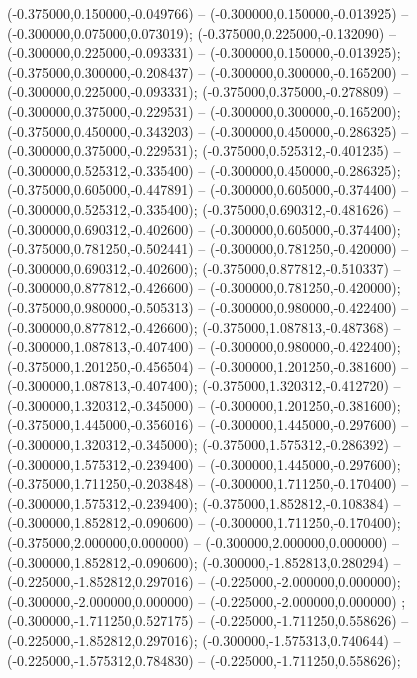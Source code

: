  (-0.375000,0.150000,-0.049766) -- (-0.300000,0.150000,-0.013925) -- (-0.300000,0.075000,0.073019);
 (-0.375000,0.225000,-0.132090) -- (-0.300000,0.225000,-0.093331) -- (-0.300000,0.150000,-0.013925);
 (-0.375000,0.300000,-0.208437) -- (-0.300000,0.300000,-0.165200) -- (-0.300000,0.225000,-0.093331);
 (-0.375000,0.375000,-0.278809) -- (-0.300000,0.375000,-0.229531) -- (-0.300000,0.300000,-0.165200);
 (-0.375000,0.450000,-0.343203) -- (-0.300000,0.450000,-0.286325) -- (-0.300000,0.375000,-0.229531);
 (-0.375000,0.525312,-0.401235) -- (-0.300000,0.525312,-0.335400) -- (-0.300000,0.450000,-0.286325);
 (-0.375000,0.605000,-0.447891) -- (-0.300000,0.605000,-0.374400) -- (-0.300000,0.525312,-0.335400);
 (-0.375000,0.690312,-0.481626) -- (-0.300000,0.690312,-0.402600) -- (-0.300000,0.605000,-0.374400);
 (-0.375000,0.781250,-0.502441) -- (-0.300000,0.781250,-0.420000) -- (-0.300000,0.690312,-0.402600);
 (-0.375000,0.877812,-0.510337) -- (-0.300000,0.877812,-0.426600) -- (-0.300000,0.781250,-0.420000);
 (-0.375000,0.980000,-0.505313) -- (-0.300000,0.980000,-0.422400) -- (-0.300000,0.877812,-0.426600);
 (-0.375000,1.087813,-0.487368) -- (-0.300000,1.087813,-0.407400) -- (-0.300000,0.980000,-0.422400);
 (-0.375000,1.201250,-0.456504) -- (-0.300000,1.201250,-0.381600) -- (-0.300000,1.087813,-0.407400);
 (-0.375000,1.320312,-0.412720) -- (-0.300000,1.320312,-0.345000) -- (-0.300000,1.201250,-0.381600);
 (-0.375000,1.445000,-0.356016) -- (-0.300000,1.445000,-0.297600) -- (-0.300000,1.320312,-0.345000);
 (-0.375000,1.575312,-0.286392) -- (-0.300000,1.575312,-0.239400) -- (-0.300000,1.445000,-0.297600);
 (-0.375000,1.711250,-0.203848) -- (-0.300000,1.711250,-0.170400) -- (-0.300000,1.575312,-0.239400);
 (-0.375000,1.852812,-0.108384) -- (-0.300000,1.852812,-0.090600) -- (-0.300000,1.711250,-0.170400);
 (-0.375000,2.000000,0.000000) -- (-0.300000,2.000000,0.000000) -- (-0.300000,1.852812,-0.090600);
 (-0.300000,-1.852813,0.280294) -- (-0.225000,-1.852812,0.297016) -- (-0.225000,-2.000000,0.000000);
 (-0.300000,-2.000000,0.000000) -- (-0.225000,-2.000000,0.000000) ;
 (-0.300000,-1.711250,0.527175) -- (-0.225000,-1.711250,0.558626) -- (-0.225000,-1.852812,0.297016);
 (-0.300000,-1.575313,0.740644) -- (-0.225000,-1.575312,0.784830) -- (-0.225000,-1.711250,0.558626);
